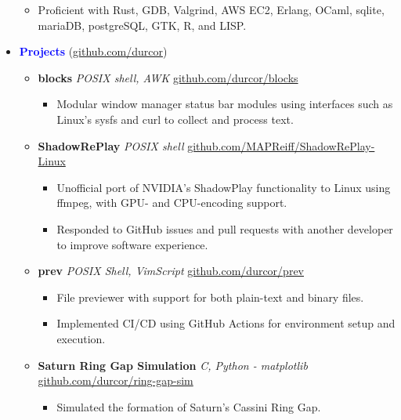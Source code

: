\documentclass[11pt]{article}
\begin{document}
\begin{flushleft}
\begin{itemize}
\begin{itemize}
            \item Proficient with Rust, GDB, Valgrind, AWS EC2, Erlang, OCaml, sqlite, mariaDB, postgreSQL, GTK, R, and LISP.
        \end{itemize}
    \item[] \Large \textcolor{blue}{\textbf{Projects}} (\href{https://github.com/durcor}{github.com/durcor}) \normalsize
        \begin{itemize}
            \item \textbf{blocks} \textit{POSIX shell, AWK} \hfill{\href{https://github.com/durcor/blocks}{github.com/durcor/blocks}}
                \begin{itemize}
                    \item Modular window manager status bar modules using interfaces such as Linux's sysfs and curl to collect and process text.
                \end{itemize}
            \item \textbf{ShadowRePlay} \textit{POSIX shell} \hfill{\href{https://github.com/MAPReiff/ShadowRePlay-Linux}{github.com/MAPReiff/ShadowRePlay-Linux}}
                \begin{itemize}
                    \item Unofficial port of NVIDIA's ShadowPlay functionality to Linux using ffmpeg, with GPU- and CPU-encoding support.
                    \item Responded to GitHub issues and pull requests with another developer to improve software experience.
                \end{itemize}
            \item \textbf{prev} \textit{POSIX Shell, VimScript} \hfill{\href{https://github.com/durcor/prev}{github.com/durcor/prev}}
                \begin{itemize}
                    \item File previewer with support for both plain-text and binary files.
                    \item Implemented CI/CD using GitHub Actions for environment setup and execution.
                \end{itemize}
            \item \textbf{Saturn Ring Gap Simulation} \textit{C, Python - matplotlib} \hfill{\href{https://github.com/durcor/ring-gap-sim}{github.com/durcor/ring-gap-sim}}
                \begin{itemize}
                    \item Simulated the formation of Saturn's Cassini Ring Gap.

\end{itemize}
\end{itemize}
\end{itemize}
\end{flushleft}
\end{document}

